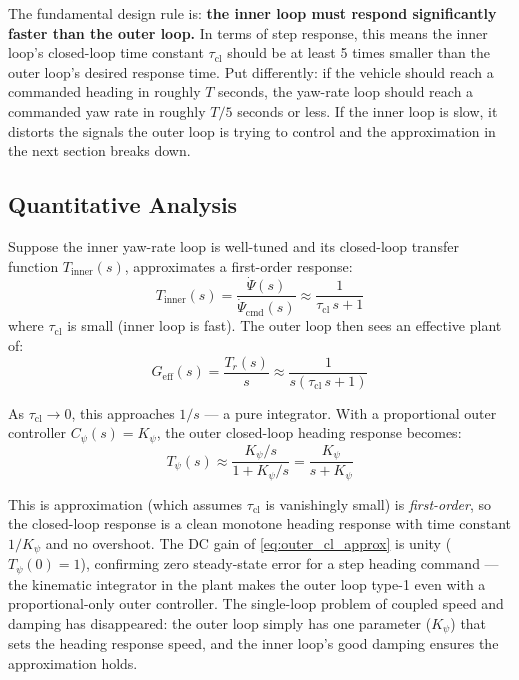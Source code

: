 \documentclass[12pt]{article}
\begin{document}
The fundamental design rule is: \textbf{the inner loop must respond
significantly faster than the outer loop.}  In terms of step response, this
means the inner loop's closed-loop time constant $\tau_\mathrm{cl}$ should
be at least 5 times smaller than the outer loop's desired response time.
Put differently: if the vehicle should reach a commanded heading in roughly
$T$ seconds, the yaw-rate loop should reach a commanded yaw rate in roughly
$T/5$ seconds or less.  If the inner loop is slow, it distorts the signals
the outer loop is trying to control and the approximation in the next section
breaks down.

\subsection{Quantitative Analysis}

Suppose the inner yaw-rate loop is well-tuned and its closed-loop transfer
function $T_{\mathrm{inner}}(s)$, approximates a first-order response:
\begin{equation}
  T_{\mathrm{inner}}(s) = \frac{\dot\Psi(s)}{\dot\Psi_\mathrm{cmd}(s)}
           \approx \frac{1}{\tau_\mathrm{cl}\,s + 1}
  \label{eq:inner_cl}
\end{equation}
where $\tau_\mathrm{cl}$ is small (inner loop is fast).  The outer loop then
sees an effective plant of:
\begin{equation}
  G_\mathrm{eff}(s) = \frac{T_r(s)}{s} \approx \frac{1}{s(\tau_\mathrm{cl}\,s + 1)}
  \label{eq:outer_eff}
\end{equation}

As $\tau_\mathrm{cl} \to 0$, this approaches $1/s$ --- a pure integrator.
With a proportional outer controller $C_\psi(s) = K_\psi$, the outer closed-loop
heading response becomes:
\begin{equation}
  T_\psi(s) \approx \frac{K_\psi/s}{1 + K_\psi/s} = \frac{K_\psi}{s + K_\psi}
  \label{eq:outer_cl_approx}
\end{equation}

This is approximation (which assumes $\tau_{\mathrm{cl}}$ is vanishingly small) is \emph{first-order}, so the closed-loop response is a clean monotone heading response with time
constant $1/K_\psi$ and no overshoot.  The DC gain of \cref{eq:outer_cl_approx}
is unity ($T_\psi(0) = 1$), confirming zero steady-state error for a step
heading command --- the kinematic integrator in the plant makes the outer loop
type-1 even with a proportional-only outer controller.  The single-loop problem of
coupled speed and damping has disappeared: the outer loop simply has one
parameter ($K_\psi$) that sets the heading response speed, and the inner
loop's good damping ensures the approximation holds.
\end{document}
